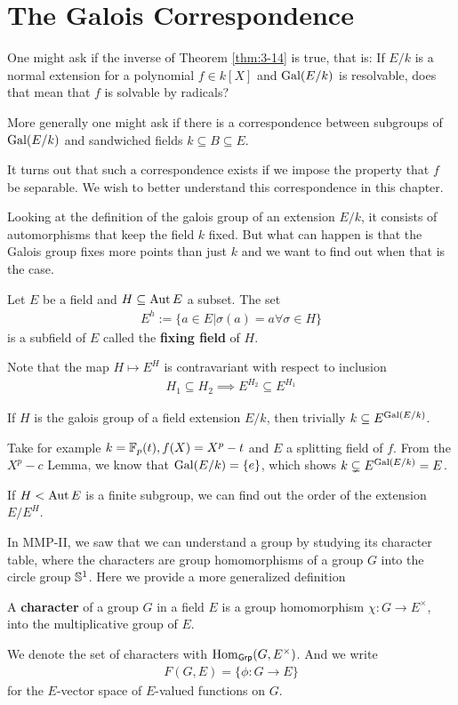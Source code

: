\section{The Galois Correspondence}

One might ask if the inverse of Theorem \ref{thm:3-14} is true, that is: 
If $E/k$ is a normal extension for a polynomial $f \in k[X]$ and $\operatorname{Gal}(E/k)$ is resolvable, does that mean that $f$ is solvable by radicals?

More generally one might ask if there is a correspondence between subgroups of $\operatorname{Gal}(E/k)$ and sandwiched fields $k \subseteq B \subseteq E$.

It turns out that such a correspondence exists if we impose the property that $f$ be separable.
We wish to better understand this correspondence in this chapter.

Looking at the definition of the galois group of an extension $E/k$, it consists of automorphisms that keep the field $k$ fixed.
But what can happen is that the Galois group fixes more points than just $k$ and we want to find out when that is the case.

\begin{dfn}[]
  Let $E$ be a field and $H \subseteq \operatorname{Aut} E$ a subset. The set
  \begin{align*}
    E^{h} := \{a \in E \big\vert \sigma(a) = a \forall \sigma \in H\}
  \end{align*}
  is a subfield of $E$ called the \textbf{fixing field} of $H$.
\end{dfn}
Note that the map $H \mapsto E^{H}$ is contravariant with respect to inclusion
\begin{align*}
  H_1 \subseteq H_2 \implies E^{H_2} \subseteq E^{H_1}
\end{align*}

If $H$ is the galois group of a field extension $E/k$, then trivially $k \subseteq E^{\operatorname{Gal}(E/k)}$.

\begin{ex}[]
  Take for example $k = \mathbb{F}_p(t), f(X) = X^{p}-t$ and $E$ a splitting field of $f$.
  From the $X^{p}-c$ Lemma, we know that $\operatorname{Gal}(E/k) = \{e\}$, which shows $k \subsetneq E^{\operatorname{Gal}(E/k)} = E$.
\end{ex}

If $H < \operatorname{Aut} E$ is a finite subgroup, we can find out the order of the extension $E/E^{H}$.


In MMP-II, we saw that we can understand a group by studying its character table, where the characters are group homomorphisms of a group $G$ into the circle group $\mathbb{S}^{1}$. 
Here we provide a more generalized definition
\begin{dfn}[]
  A \textbf{character} of a group $G$ in a field $E$ is a group homomorphism $\chi: G \to  E^{\times}$, into the multiplicative group of $E$.

  We denote the set of characters with $\operatorname{Hom}_{\text{\sffamily Grp}}(G,E^{\times})$.
  And we write
  \begin{align*}
    F(G,E) = \{\phi: G \to E\}
  \end{align*}
  for the $E$-vector space of $E$-valued functions on $G$.
\end{dfn}


